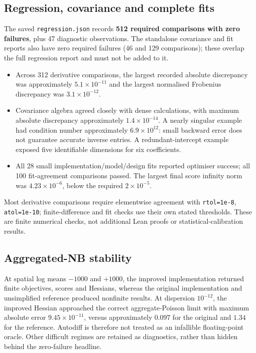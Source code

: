 \documentclass[11pt,a4paper]{article}
\begin{document}
\subsection{Regression, covariance and complete fits}
The saved \texttt{regression.json} records \textbf{512 required comparisons
with zero failures}, plus 47 diagnostic observations. The standalone covariance
and fit reports also have zero required failures (46 and 129 comparisons);
these overlap the full regression report and must not be added to it.

\begin{itemize}
\item Across 312 derivative comparisons, the largest recorded absolute
discrepancy was approximately $5.1\times10^{-11}$ and the largest normalised
Frobenius discrepancy was $3.1\times10^{-12}$.
\item Covariance algebra agreed closely with dense calculations, with maximum
absolute discrepancy approximately $1.4\times10^{-14}$. A nearly singular
example had condition number approximately $6.9\times10^{12}$: small backward
error does not guarantee accurate inverse entries. A redundant-intercept
example exposed five identifiable dimensions for six coefficients.
\item All 28 small implementation/model/design fits reported optimiser success;
all 100 fit-agreement comparisons passed. The largest final score infinity
norm was $4.23\times10^{-6}$, below the required $2\times10^{-5}$.
\end{itemize}
Most derivative comparisons require elementwise agreement with
\texttt{rtol=1e-8}, \texttt{atol=1e-10}; finite-difference and fit checks use their
own stated thresholds. These are finite numerical checks, not additional
Lean proofs or statistical-calibration results.

\subsection{Aggregated-NB stability}
At spatial log means $-1000$ and $+1000$, the improved implementation returned
finite objectives, scores and Hessians, whereas the original implementation
and unsimplified reference produced nonfinite results.
At dispersion $10^{-12}$, the improved Hessian approached the correct
aggregate-Poisson limit with maximum absolute error $9.45\times10^{-11}$,
versus approximately $0.097$ for the original and $1.34$ for the reference.
Autodiff is therefore not treated as an infallible floating-point oracle.
Other difficult regimes are retained as diagnostics, rather than hidden behind
the zero-failure headline.
\end{document}
